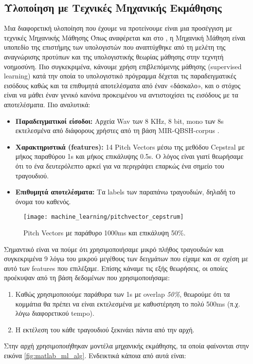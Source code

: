 \subsection{Υλοποίηση με Τεχνικές Μηχανικής Εκμάθησης}
Μια διαφορετική υλοποίηση που έχουμε να προτείνουμε είναι μια προσέγγιση με τεχνικές Μηχανικής Μάθησης Όπως αναφέρεται και στο \cite{mldef}, η Μηχανική Μάθηση είναι υποπεδίο της επιστήμης των υπολογιστών που αναπτύχθηκε από τη μελέτη της αναγνώρισης προτύπων και της  υπολογιστικής θεωρίας μάθησης στην τεχνητή νοημοσύνη. Πιο συγκεκριμένα, κάνουμε χρήση επιβλεπόμενης μάθησης (supervised learning) κατά την οποία το υπολογιστικό πρόγραμμα δέχεται τις παραδειγματικές εισόδους καθώς και τα επιθυμητά αποτελέσματα από έναν «δάσκαλο», και ο στόχος είναι να μάθει έναν γενικό κανόνα προκειμένου να αντιστοιχίσει τις εισόδους με τα αποτελέσματα.
Πιο αναλυτικά:
\begin{itemize}
  \item \textbf{Παραδειγματικοί είσοδοι:} Αρχεία Wav των 8 KHz, 8 bit, mono των 8s εκτελεσμένα από διάφορους χρήστες από τη βάση MIR-QBSH-corpus \cite{jang-dataset}.
  \item \textbf{Χαρακτηριστικά (features):} 14 Pitch Vectors μέσω της μεθόδου Cepstral\cite{cepstral} με μήκος παραθύρου 1s και μήκος επικάλυψης 0.5s. Ο λόγος είναι γιατί θεωρήσαμε ότι το ένα δευτερόλεπτο αρκεί για να περιγράψει επαρκώς ένα σημείο του τραγουδιού.
  \item \textbf{Επιθυμητά αποτελέσματα:} Τα labels των παραπάνω τραγουδιών, δηλαδή το όνομα του καθενός.
\end{itemize}

\begin{figure}
        \centering
        \vspace{-20pt}\texttt{[image: machine\_learning/pitchvector\_cepstrum]}
        \vspace{-20pt}\caption{Pitch Vectors με παράθυρο 1000ms και επικάλυψη 50\%.}
        \label{fig:pvcepstrum}
\end{figure}

Σημαντικό είναι να πούμε ότι χρησιμοποιήσαμε μικρό πλήθος τραγουδιών και συγκεκριμένα 9 λόγω του μικρού μεγέθους των δειγμάτων που είχαμε και σε σχέση με αυτό των features που επιλέξαμε. Επίσης κάναμε τις εξής θεωρήσεις, οι οποίες προέκυψαν από τη βάση δεδομένων που χρησιμοποιήσαμε:
\begin{enumerate}
  \item Καθώς χρησιμοποιούμε παράθυρα των 1s με overlap \textit{50\%}, θεωρούμε ότι τα κομμάτια θα πρέπει να είναι εκτελεσμένα με καθυστέρηση το πολύ 500ms (π.χ. λόγω διαφορετικού tempo).
  \item Η εκτέλεση του κάθε τραγουδιού ξεκινάει πάντα από την αρχή.
\end{enumerate}
Στην αρχή χρησιμοποιήθηκαν μοντέλα μηχανικής εκμάθησης, τα οποία φαίνονται στην εικόνα \ref{fig:matlab_ml_alg}. Ενδεικτικά κάποια από αυτά είναι: 

